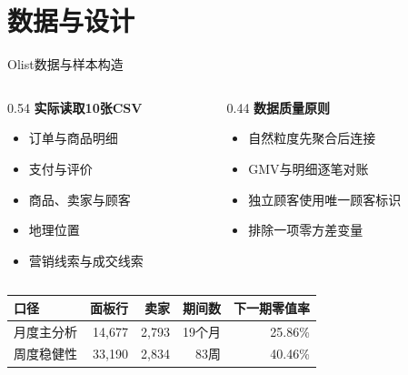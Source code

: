 \documentclass[aspectratio=169]{beamer}
\begin{document}
\section{数据与设计}

\begin{frame}{Olist数据与样本构造}
  \begin{columns}[T]
    \begin{column}{0.54\textwidth}
      \textbf{实际读取10张CSV}
      \begin{itemize}
        \item 订单与商品明细
        \item 支付与评价
        \item 商品、卖家与顾客
        \item 地理位置
        \item 营销线索与成交线索
      \end{itemize}
    \end{column}
    \begin{column}{0.44\textwidth}
      \textbf{数据质量原则}
      \begin{itemize}
        \item 自然粒度先聚合后连接
        \item GMV与明细逐笔对账
        \item 独立顾客使用唯一顾客标识
        \item 排除一项零方差变量
      \end{itemize}
    \end{column}
  \end{columns}
  \begin{table}
    \centering
    \small
    \begin{tabular}{lrrrr}
      \toprule
      口径 & 面板行 & 卖家 & 期间数 & 下一期零值率 \\
      \midrule
      月度主分析 & 14,677 & 2,793 & 19个月 & 25.86\% \\
      周度稳健性 & 33,190 & 2,834 & 83周 & 40.46\% \\
      \bottomrule
    \end{tabular}
  \end{table}
\end{frame}
\end{document}
